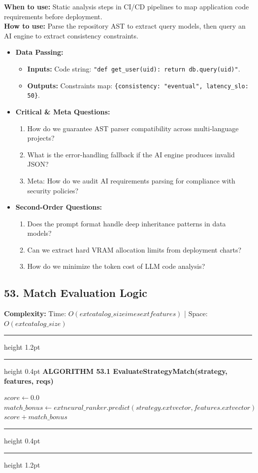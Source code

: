 \documentclass[11pt,a4paper]{article}
\newenvironment{textbookalgo}[2]{%
  \par\addvspace{1.2em}\noindent
  \hrule height 1.2pt
  \vspace{1.5pt}
  \hrule height 0.4pt
  \vspace{5pt}
  {\noindent\large\bfseries\sffamily ALGORITHM #1 \quad #2}
  \par\vspace{5pt}
  \RestyleAlgo{plain}
}{%
  \par\vspace{4pt}
  \hrule height 0.4pt
  \vspace{1.5pt}
  \hrule height 1.2pt
  \par\addvspace{1.2em}
}
\theoremstyle{definition}
\begin{document}
\noindent
\textbf{When to use:} Static analysis steps in CI/CD pipelines to map application code requirements before deployment.\\
\textbf{How to use:} Parse the repository AST to extract query models, then query an AI engine to extract consistency constraints.
\begin{itemize}[leftmargin=*]
  \item[] \textbf{Data Passing:}
    \begin{itemize}
      \item \textbf{Inputs:} Code string: \texttt{"def get\_user(uid): return db.query(uid)"}.
      \item \textbf{Outputs:} Constraints map: \texttt{\{consistency: "eventual", latency\_slo: 50\}}.
    \end{itemize}
  \item[] \textbf{Critical \& Meta Questions:}
  \begin{enumerate}
    \item How do we guarantee AST parser compatibility across multi-language projects?
    \item What is the error-handling fallback if the AI engine produces invalid JSON?
    \item Meta: How do we audit AI requirements parsing for compliance with security policies?
  \end{enumerate}
  \item[] \textbf{Second-Order Questions:}
  \begin{enumerate}
    \item Does the prompt format handle deep inheritance patterns in data models?
    \item Can we extract hard VRAM allocation limits from deployment charts?
    \item How do we minimize the token cost of LLM code analysis?
  \end{enumerate}
\end{itemize}
\medskip

\clearpage
\subsection{53. Match Evaluation Logic}


\noindent
\textbf{Complexity:} Time: $O(	ext{catalog\_size} 	imes 	ext{features})$ | Space: $O(	ext{catalog\_size})$
\smallskip

\begin{textbookalgo}{53.1}{EvaluateStrategyMatch(strategy, features, reqs)}
\begin{algorithm}[H]
$score \leftarrow 0.0$\;
$match\_bonus \leftarrow 	ext{neural\_ranker.predict}(strategy.	ext{vector}, features.	ext{vector})$\;
\Return $score + match\_bonus$\;
\end{algorithm}
\end{textbookalgo}
\end{document}
